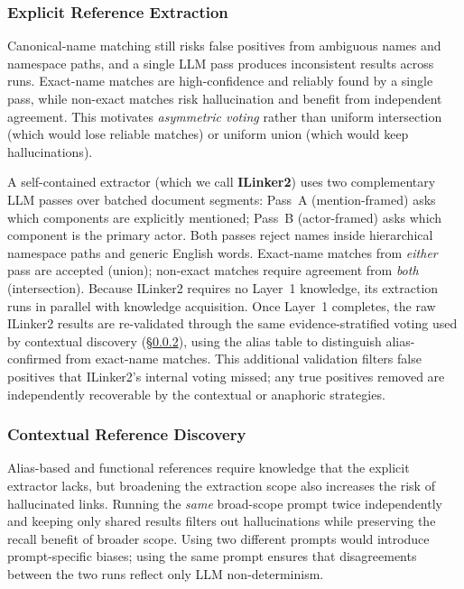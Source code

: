 \subsubsection{Explicit Reference Extraction}\label{sec:seed}

Canonical-name matching still risks false positives from ambiguous
names and namespace paths, and a single LLM pass produces
inconsistent results across runs.
Exact-name matches are high-confidence and reliably found by a
single pass, while non-exact matches risk hallucination and benefit
from independent agreement.
This motivates \emph{asymmetric voting} rather than uniform
intersection (which would lose reliable matches) or uniform union
(which would keep hallucinations).

A self-contained extractor (which we call \textbf{ILinker2}) uses two
complementary LLM passes over batched document segments:
Pass~A (mention-framed) asks which components are explicitly
mentioned; Pass~B (actor-framed) asks which component is the
primary actor.
Both passes reject names inside hierarchical namespace paths and
generic English words.
Exact-name matches from \emph{either} pass are accepted (union);
non-exact matches require agreement from \emph{both}
(intersection).
Because ILinker2 requires no Layer~1 knowledge, its extraction
runs in parallel with knowledge acquisition.
Once Layer~1 completes, the raw ILinker2 results are
re-validated through the same evidence-stratified voting used by
contextual discovery (\S\ref{sec:entity}), using the alias table
to distinguish alias-confirmed from exact-name matches.
This additional validation filters false positives that
ILinker2's internal voting missed; any true positives removed
are independently recoverable by the contextual or anaphoric
strategies.

\subsubsection{Contextual Reference Discovery}\label{sec:entity}

Alias-based and functional references require knowledge that the
explicit extractor lacks, but broadening the extraction scope also
increases the risk of hallucinated links.
Running the \emph{same} broad-scope prompt twice independently
and keeping only shared results filters out hallucinations while
preserving the recall benefit of broader scope.
Using two different prompts would introduce prompt-specific biases;
using the same prompt ensures that disagreements between the two
runs reflect only LLM non-determinism.

